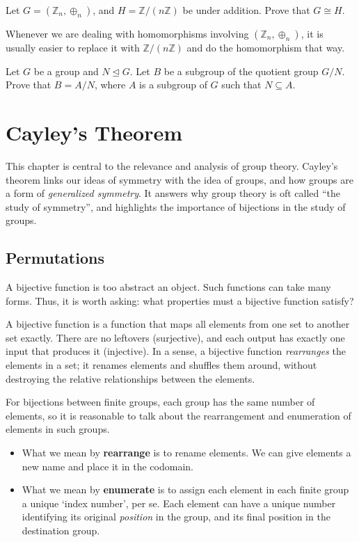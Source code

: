 \begin{problem}\label{problem-Zn-isomorphic-to-Z-by-nZ}
    Let $G = (\mathbb{Z}_n, \oplus_n)$, and $H = \mathbb{Z}/(n\mathbb{Z})$ be under addition. Prove that $G \cong H$.
\end{problem}
\begin{remark}
    Whenever we are dealing with homomorphisms involving $(\mathbb{Z}_n, \oplus_n)$, it is usually easier to replace it with $\mathbb{Z}/(n\mathbb{Z})$ and do the homomorphism that way.
\end{remark}

\begin{problem}\label{problem-subgroup-of-quotient-group-is-quotient-group}
    Let $G$ be a group and $N \unlhd G$. Let $B$ be a subgroup of the quotient group $G/N$. Prove that $B = A/N$, where $A$ is a subgroup of $G$ such that $N \subseteq A$.
\end{problem}

\chapter{Cayley's Theorem}
This chapter is central to the relevance and analysis of group theory. Cayley's theorem links our ideas of symmetry with the idea of groups, and how groups are a form of \textit{generalized symmetry}. It answers why group theory is oft called ``the study of symmetry'', and highlights the importance of bijections in the study of groups.

\section{Permutations}
A bijective function is too abstract an object. Such functions can take many forms. Thus, it is worth asking: what properties must a bijective function satisfy?

A bijective function is a function that maps all elements from one set to another set exactly. There are no leftovers (surjective), and each output has exactly one input that produces it (injective). In a sense, a bijective function \textit{rearranges} the elements in a set; it renames elements and shuffles them around, without destroying the relative relationships between the elements.

For bijections between finite groups, each group has the same number of elements, so it is reasonable to talk about the rearrangement and enumeration of elements in such groups.
\begin{itemize}
    \item What we mean by \textbf{rearrange} is to rename elements. We can give elements a new name and place it in the codomain.
    \item What we mean by \textbf{enumerate} is to assign each element in each finite group a unique `index number', per se. Each element can have a unique number identifying its original \textit{position} in the group, and its final position in the destination group.
\end{itemize}

